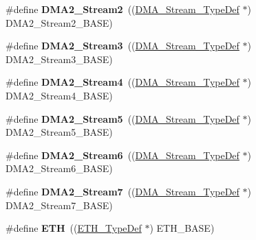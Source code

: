 \begin{DoxyCompactItemize}
\item 
\hypertarget{group___peripheral__declaration_ga71bb410664b861ff0520f08976e24ee1}{\#define {\bfseries D\-M\-A2\-\_\-\-Stream2}~((\hyperlink{struct_d_m_a___stream___type_def}{D\-M\-A\-\_\-\-Stream\-\_\-\-Type\-Def} $\ast$) D\-M\-A2\-\_\-\-Stream2\-\_\-\-B\-A\-S\-E)}\label{group___peripheral__declaration_ga71bb410664b861ff0520f08976e24ee1}

\item 
\hypertarget{group___peripheral__declaration_gaa6ead6a5ca6b8df70b5505aaeec6fd2e}{\#define {\bfseries D\-M\-A2\-\_\-\-Stream3}~((\hyperlink{struct_d_m_a___stream___type_def}{D\-M\-A\-\_\-\-Stream\-\_\-\-Type\-Def} $\ast$) D\-M\-A2\-\_\-\-Stream3\-\_\-\-B\-A\-S\-E)}\label{group___peripheral__declaration_gaa6ead6a5ca6b8df70b5505aaeec6fd2e}

\item 
\hypertarget{group___peripheral__declaration_gae32674772021620800275dd3b6d62c2f}{\#define {\bfseries D\-M\-A2\-\_\-\-Stream4}~((\hyperlink{struct_d_m_a___stream___type_def}{D\-M\-A\-\_\-\-Stream\-\_\-\-Type\-Def} $\ast$) D\-M\-A2\-\_\-\-Stream4\-\_\-\-B\-A\-S\-E)}\label{group___peripheral__declaration_gae32674772021620800275dd3b6d62c2f}

\item 
\hypertarget{group___peripheral__declaration_gac40f58718761251875b5a897287efd83}{\#define {\bfseries D\-M\-A2\-\_\-\-Stream5}~((\hyperlink{struct_d_m_a___stream___type_def}{D\-M\-A\-\_\-\-Stream\-\_\-\-Type\-Def} $\ast$) D\-M\-A2\-\_\-\-Stream5\-\_\-\-B\-A\-S\-E)}\label{group___peripheral__declaration_gac40f58718761251875b5a897287efd83}

\item 
\hypertarget{group___peripheral__declaration_ga11a00b283e0911cd427e277e5a314ccc}{\#define {\bfseries D\-M\-A2\-\_\-\-Stream6}~((\hyperlink{struct_d_m_a___stream___type_def}{D\-M\-A\-\_\-\-Stream\-\_\-\-Type\-Def} $\ast$) D\-M\-A2\-\_\-\-Stream6\-\_\-\-B\-A\-S\-E)}\label{group___peripheral__declaration_ga11a00b283e0911cd427e277e5a314ccc}

\item 
\hypertarget{group___peripheral__declaration_gacc135dbca0eca67d5aa0abc555f053ce}{\#define {\bfseries D\-M\-A2\-\_\-\-Stream7}~((\hyperlink{struct_d_m_a___stream___type_def}{D\-M\-A\-\_\-\-Stream\-\_\-\-Type\-Def} $\ast$) D\-M\-A2\-\_\-\-Stream7\-\_\-\-B\-A\-S\-E)}\label{group___peripheral__declaration_gacc135dbca0eca67d5aa0abc555f053ce}

\item 
\hypertarget{group___peripheral__declaration_ga3a3f60de4318afbd0b3318e7a416aadc}{\#define {\bfseries E\-T\-H}~((\hyperlink{struct_e_t_h___type_def}{E\-T\-H\-\_\-\-Type\-Def} $\ast$) E\-T\-H\-\_\-\-B\-A\-S\-E)}\label{group___peripheral__declaration_ga3a3f60de4318afbd0b3318e7a416aadc}


\end{DoxyCompactItemize}
